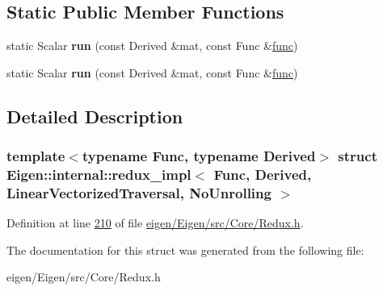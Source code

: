 \subsection*{Static Public Member Functions}
\begin{DoxyCompactItemize}
\item 
\mbox{\label{struct_eigen_1_1internal_1_1redux__impl_3_01_func_00_01_derived_00_01_linear_vectorized_traversal_00_01_no_unrolling_01_4_aebee3fe3766fc03d8069104053095ca8}} 
static Scalar {\bfseries run} (const Derived \&mat, const Func \&\hyperlink{structfunc}{func})
\item 
\mbox{\label{struct_eigen_1_1internal_1_1redux__impl_3_01_func_00_01_derived_00_01_linear_vectorized_traversal_00_01_no_unrolling_01_4_aebee3fe3766fc03d8069104053095ca8}} 
static Scalar {\bfseries run} (const Derived \&mat, const Func \&\hyperlink{structfunc}{func})
\end{DoxyCompactItemize}


\subsection{Detailed Description}
\subsubsection*{template$<$typename Func, typename Derived$>$\newline
struct Eigen\+::internal\+::redux\+\_\+impl$<$ Func, Derived, Linear\+Vectorized\+Traversal, No\+Unrolling $>$}



Definition at line \hyperlink{eigen_2_eigen_2src_2_core_2_redux_8h_source_l00210}{210} of file \hyperlink{eigen_2_eigen_2src_2_core_2_redux_8h_source}{eigen/\+Eigen/src/\+Core/\+Redux.\+h}.



The documentation for this struct was generated from the following file\+:\begin{DoxyCompactItemize}
\item 
eigen/\+Eigen/src/\+Core/\+Redux.\+h\end{DoxyCompactItemize}
